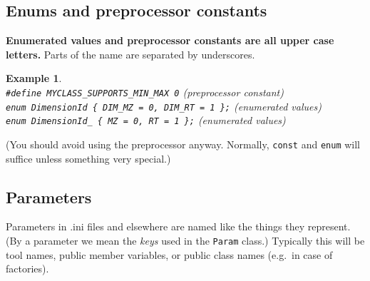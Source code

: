 \documentclass[a4]{article}
\newtheorem{example}{Example}
\begin{document}
\subsection{Enums and preprocessor constants}

\textbf{Enumerated values and preprocessor constants are all upper case
  letters.}  Parts of the name are separated by underscores.
\begin{example}~\\
  {\tt \#define MYCLASS\_SUPPORTS\_MIN\_MAX 0} (preprocessor constant) \\
  {\tt enum DimensionId \{ DIM\_MZ = 0, DIM\_RT = 1 \};} (enumerated values) \\
  {\tt enum DimensionId\_ \{ MZ = 0, RT = 1 \};} (enumerated values)
\end{example}
(You should avoid using the preprocessor anyway.  Normally, \texttt{const} and
\texttt{enum} will suffice unless something very special.)

\subsection{Parameters}

Parameters in .ini files and elsewhere are named like the things they
represent.  (By a parameter we mean the \emph{keys} used in the \texttt{Param}
class.)  Typically this will be tool names, public member variables, or public class names
(e.g.\ in case of factories).

\end{document}
